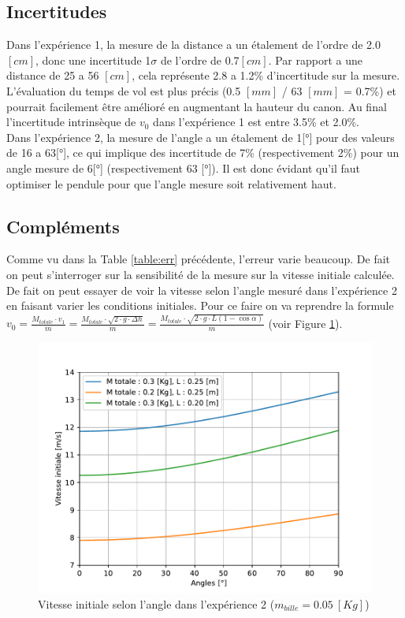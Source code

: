 \documentclass[11pt]{article}
\begin{document}
\subsection{Incertitudes} \label{subsec:incert}
Dans l'expérience 1, la mesure de la distance a un étalement de l'ordre de 2.0 $[cm]$, donc une incertitude 1$\sigma$ de l'ordre de 0.7$[cm]$.
Par rapport a une distance de 25 a 56 $[cm]$, cela représente 2.8 a 1.2\% d'incertitude sur la mesure.
L'évaluation du temps de vol est plus précis (0.5 $[mm]$ / 63 $[mm]$ = 0.7\%) et pourrait facilement être amélioré en augmentant la hauteur du canon.
Au final l'incertitude intrinsèque de $v_0$ dans l'expérience 1 est entre 3.5\% et 2.0\%.\\
Dans l'expérience 2, la mesure de l'angle a un étalement de 1[°] pour des valeurs de 16 a 63[°], ce qui implique des incertitude de 7\% (respectivement 2\%) pour un angle mesure de 6[°] (respectivement 63 [°]).
Il est donc évidant qu'il faut optimiser le pendule pour que l'angle mesure soit relativement haut.

\subsection{Compléments} \label{subsec:comp}
Comme vu dans la Table \ref{table:err} précédente, l'erreur varie beaucoup. De fait on peut s'interroger sur la sensibilité de la mesure sur la vitesse initiale calculée. De fait on peut essayer de voir la vitesse selon l'angle mesuré dans l'expérience 2 en faisant varier les conditions initiales. Pour ce faire on va reprendre la formule $v_{0} = \frac{M_{totale} \cdot v_{1}}{m} = \frac{M_{totale} \cdot \sqrt{2 \cdot g \cdot \Delta h}}{m} =  \frac{M_{totale} \cdot \sqrt{2 \cdot g \cdot L(1-\cos \alpha)}}{m}$ (voir Figure \ref{figure:graph_vit_angle}).

\begin{figure}[H]
\center
\includegraphics[scale=1]{Graph/vit_angle_plt.pdf}
\caption{Vitesse initiale selon l'angle dans l'expérience 2 ($m_{bille} = 0.05 \ [Kg]$)}
\label{figure:graph_vit_angle}
\end{figure}
\end{document}
